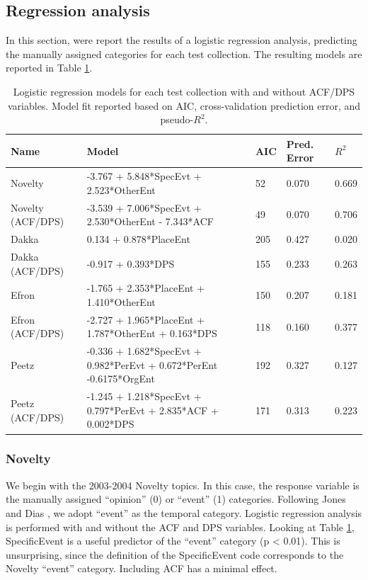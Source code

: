 \documentclass{sig-alternate}
\begin{document}
\subsection{Regression analysis}

In this section, were report the results of a logistic regression analysis, predicting the manually assigned categories for each test collection. The resulting models are reported in Table \ref{table.regresults}. 

\begin{table}
\small
\begin{tabular}{| l | l | l | l | l |} \hline
\bf{Name} & \bf{Model} & \bf{AIC} & \bf{Pred. Error} & \bf{$R^2$} \\ \hline
Novelty 	&  -3.767 + 5.848*SpecEvt + 2.523*OtherEnt & 52 & 0.070 & 0.669 \\ \hline
Novelty (ACF/DPS)		&  -3.539 + 7.006*SpecEvt + 2.530*OtherEnt - 7.343*ACF & 49 & 0.070 & 0.706 \\ \hline
Dakka	&  0.134 + 0.878*PlaceEnt  & 205 & 0.427 & 0.020 \\ \hline
Dakka (ACF/DPS) 		& -0.917 + 0.393*DPS 	& 155 & 0.233 & 0.263  \\ \hline
Efron	& -1.765 + 2.353*PlaceEnt + 1.410*OtherEnt & 150 &0.207& 0.181 \\ \hline
Efron (ACF/DPS) 		& -2.727 + 1.965*PlaceEnt + 1.787*OtherEnt  + 0.163*DPS & 118 & 0.160 & 0.377 \\ \hline
Peetz & -0.336 + 1.682*SpecEvt + 0.982*PerEvt + 0.672*PerEnt -0.6175*OrgEnt & 192 & 0.327 & 0.127 \\ \hline
Peetz (ACF/DPS) 		& -1.245 + 1.218*SpecEvt + 0.797*PerEvt + 2.835*ACF + 0.002*DPS & 171 & 0.313 & 0.223 \\ \hline
\end{tabular}
\label{table.regresults}
\caption{Logistic regression models for each test collection with and without ACF/DPS variables.  Model fit reported based on AIC, cross-validation prediction error, and pseudo-$R^2$.}
\end{table}

\subsubsection{Novelty}

We begin with the 2003-2004 Novelty topics. In this case, the response variable is the manually assigned ``opinion'' (0) or ``event'' (1) categories.  Following Jones and Dias \cite{Jones2007}, we adopt ``event'' as the temporal category. Logistic regression analysis is performed with and without the ACF and DPS variables.  Looking at Table \ref{table.regresults}, SpecificEvent is a useful predictor of the ``event'' category (p < 0.01). This is unsurprising, since the definition of the SpecificEvent code corresponds to the Novelty ``event'' category. Including ACF has a minimal effect. 
\end{document}
